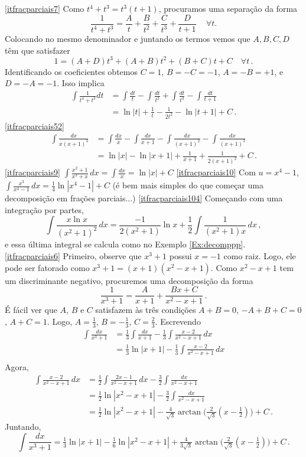 \begin{exo}
\begin{sol}
\eqref{itfracparciais7} 
Como $t^4+t^3=t^3(t+1)$, procuramos uma separação da forma 
$$
\frac{1}{t^4+t^3}=\frac{A}{t}+\frac{B}{t^2}+\frac{C}{t^3}+\frac{D}{t+1}\,\quad
\forall t.
$$
Colocando no mesmo denominador e juntando os termos vemos que $A,B,C,D$ têm que
satisfazer 
$$
1=(A+D)t^3+(A+B)t^2+(B+C)t+C\quad\forall t\,.
$$
Identificando os coeficientes obtemos $C=1$, $B=-C=-1$, $A=-B=+1$, e
$D=-A=-1$. Isso implica
\begin{align*}
\int \frac{1}{t^4+t^3}dt&=\int\frac{dt}{t}-\int \frac{dt}{t^2}+\int
\frac{dt}{t^3}-\int \frac{dt}{t+1}\\
&=\ln|t|+\frac{1}{t}-\frac{1}{2t^2}-\ln|t+1|+C\,.
\end{align*}
\eqref{itfracparciais52} 
\begin{align*}
\int\frac{dx}{x(x+1)^3}
&=\int
\frac{dx}{x}-\int\frac{dx}{x+1}-\int\frac{dx}{(x+1)^2}-\int\frac{dx}{(x+1)^3}\\
&=\ln|x|-\ln|x+1|+\frac{1}{x+1}+\frac{1}{2(x+1)^2}+C\,.
\end{align*}
\eqref{itfracparciais9} $\int\frac{x^2+1}{x^3+x}\,dx=\int \frac{dx}{x}=\ln|x|+C$
\eqref{itfracparciais10} Com
$u=x^4-1$, $\int\frac{x^3}{x^4-1}\,dx=\tfrac14\ln|x^4-1|+C$ (é bem mais simples do que começar uma
decomposição em frações parciais...)
\eqref{itfracparciais104} Começando com uma integração por partes, 
\[ 
\int \frac{x\ln x}{(x^2+1)^2}\,dx=\frac{-1}{2(x^2+1)}\ln x+\frac12\int
\frac{1}{(x^2+1)x}\,dx\,,
\]
e essa última integral se calcula como no Exemplo \ref{Ex:decomppp}.
\eqref{itfracparciais6} Primeiro, observe que $x^3+1$ possui $x=-1$ como raiz.
Logo, ele pode ser fatorado como $x^3+1=(x+1)(x^2-x+1)$. 
Como $x^2-x+1$ tem um discriminante negativo,
procuremos uma decomposição da forma
$$
\frac{1}{x^3+1}=\frac{A}{x+1}+\frac{Bx+C}{x^2-x+1}\,.
$$
É fácil ver que $A$, $B$ e $C$ satisfazem às três condições $A+B=0$,
$-A+B+C=0$, $A+C=1$. Logo, $A=\frac13$, $B=-\frac13$, $C=\frac23$. Escrevendo
\begin{align*}
 \int\frac{dx}{x^3+1}&=\tfrac{1}{3}\int\frac{dx}{x+1}-\tfrac13\int
\frac{x-2}{x^2-x+1}\,dx\\
&=\tfrac{1}{3}\ln|x+1|-\tfrac13\int
\frac{x-2}{x^2-x+1}\,dx\\
\end{align*}
Agora, 
\begin{align*}
\int \frac{x-2}{x^2-x+1}\,dx&=\tfrac12\int \frac{2x-1}{x^2-x+1}\,dx-\tfrac{3}{2}
\int\frac{dx}{x^2-x+1}\\
&=\tfrac12 \ln|x^2-x+1|-\tfrac{3}{2}
\int\frac{dx}{x^2-x+1}\\
&=\tfrac12 \ln|x^2-x+1|-\tfrac{4}{\sqrt{3}}\arctan\bigl(\tfrac{2}{\sqrt{3}}
(x-\tfrac12) \bigr)+C\,.
\end{align*}
Juntando,
$$
\int\frac{dx}{x^3+1}=\tfrac{1}{3}\ln|x+1|-\tfrac16\ln|x^2-x+1|+\tfrac{4}{3\sqrt{
3}}\arctan\bigl(\tfrac{2}{\sqrt{3}}(x-\tfrac12) \bigr)+C\,.
$$ 
\end{sol}
\end{exo}


